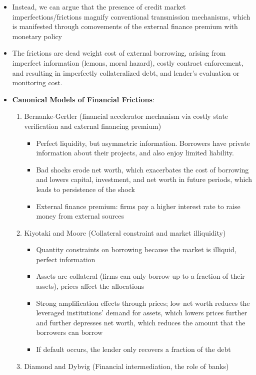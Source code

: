 \documentclass[12pt]{article}
\begin{document}
\begin{itemize}
    \item Instead, we can argue that the presence of credit market imperfections/frictions magnify conventional transmission mechanisms, which is manifested through comovements of the external finance premium with monetary policy
    \item The frictions are dead weight cost of external borrowing, arising from imperfect information (lemons, moral hazard), costly contract enforcement, and resulting in imperfectly collateralized debt, and lender's evaluation or monitoring cost.
    \item \textbf{Canonical Models of Financial Frictions}:
    \begin{enumerate}
        \item Bernanke-Gertler (financial accelerator mechanism via costly state verification and external financing premium)
        \begin{itemize}
            \item Perfect liquidity, but asymmetric information. Borrowers have private information about their projects, and also enjoy limited liability.
            \item Bad shocks erode net worth, which exacerbates the cost of borrowing and lowers capital, investment, and net worth in future periods, which leads to persistence of the shock
            \item External finance premium: firms pay a higher interest rate to raise money from external sources
        \end{itemize}
        \item Kiyotaki and Moore (Collateral constraint and market illiquidity)
        \begin{itemize}
            \item Quantity constraints on borrowing because the market is illiquid, perfect information
            \item Assets are collateral (firms can only borrow up to a fraction of their assets), prices affect the allocations
            \item Strong amplification effects through prices; low net worth reduces the leveraged institutions' demand for assets, which lowers prices further and further depresses net worth, which reduces the amount that the borrowers can borrow
            \item If default occurs, the lender only recovers a fraction of the debt
        \end{itemize}
        \item Diamond and Dybvig (Financial intermediation, the role of banks)
    \end{enumerate}
\end{itemize}
\end{document}
